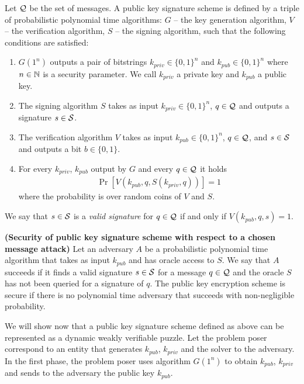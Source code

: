 \begin{definition}
Let $\mathcal{Q}$ be the set of messages. A \textnormal{public key signature scheme} is defined by a triple of probabilistic polynomial time algorithms:
$G$ -- the key generation algorithm,
$V$ -- the verification algorithm,
$S$ -- the signing algorithm,
such that the following conditions are satisfied:
\begin{enumerate}[-]
  \item $G(1^n)$ outputs a pair of bitstrings $k_{priv} \in \{0,1\}^{n}$ and $k_{pub} \in \{0,1\}^{n}$ where $n \in \mathbb{N}$ is a security parameter.
    We call $k_{priv}$ a private key and $k_{pub}$ a public key.
  \item The signing algorithm $S$ takes as input $k_{priv} \in \{0,1\}^{n}$, $q \in \mathcal{Q}$ and outputs a signature $s \in \mathcal{S}$.
  \item The verification algorithm $V$ takes as input $k_{pub} \in \{0,1\}^{n}$, $q \in \mathcal{Q}$, and $s \in \mathcal{S}$ and outputs a bit $b \in \{0,1\}$.
  \item For every $k_{priv}$, $k_{pub}$ output by $G$ and every $q \in \mathcal{Q}$ it holds
    \begin{align*}
      \Pr[V(k_{pub}, q, S(k_{priv}, q))] = 1
    \end{align*}
    where the probability is over random coins of $V$ and $S$.
\end{enumerate}
\end{definition}
We say that $s \in \mathcal{S}$ is a \textit{valid signature} for $q \in \mathcal{Q}$ if and only if $V(k_{pub}, q, s) = 1$.
%
%
\begin{definition}\textbf{(Security of public key signature scheme with respect to a chosen message attack)}
Let an \textnormal{adversary} $A$ be a probabilistic polynomial time algorithm that takes as input $k_{pub}$ and has oracle access to $S$.
We say that $A$ \textnormal{succeeds} if it finds a valid signature $s \in \mathcal{S}$ for a message $q \in \mathcal{Q}$ and the oracle $S$ has not been queried for a signature of $q$.
The public key encryption scheme is \textnormal{secure} if there is no polynomial time adversary that succeeds with non-negligible probability.
\end{definition}
%
We will show now that a public key signature scheme defined as above can be represented as a dynamic weakly verifiable puzzle.
Let the problem poser correspond to an entity that generates $k_{pub}$, $k_{priv}$ and the solver to the adversary.
In the first phase, the problem poser uses algorithm $G(1^n)$ to obtain $k_{pub}$, $k_{priv}$ and sends to the adversary the public key $k_{pub}$.
